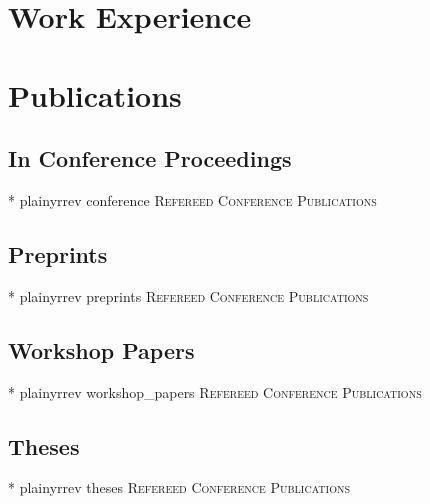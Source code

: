 \documentclass[10pt,a4paper,sans]{moderncv} %
\begin{document}

\section{Work Experience}


\section{Publications}

\subsection{In Conference Proceedings}
\nocite{conference}{*}
{plainyrrev}
{conference}
{\large \textsc{Refereed Conference Publications}}

\subsection{Preprints}
\nocite{preprints}{*}
{plainyrrev}
{preprints}
{\large \textsc{Refereed Conference Publications}}

\subsection{Workshop Papers}
\nocite{workshop_papers}{*}
{plainyrrev}
{workshop_papers}
{\large \textsc{Refereed Conference Publications}}

\subsection{Theses}
\nocite{theses}{*}
{plainyrrev}
{theses}
{\large \textsc{Refereed Conference Publications}}
\end{document}
